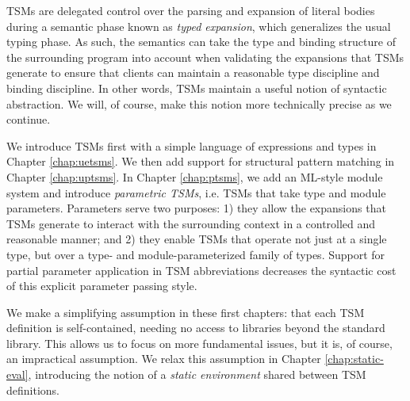 TSMs are delegated control over the parsing and expansion of literal bodies during a semantic phase known as \emph{typed expansion}, which generalizes the usual typing phase. As such, the semantics can take the type and binding structure of the surrounding program into account when validating the expansions that TSMs generate to ensure that clients can maintain a reasonable type discipline and binding discipline. In other words, TSMs maintain a useful notion of syntactic abstraction. %
We will, of course, make this notion more technically precise as we continue.

We introduce TSMs first with a simple language of expressions and types in Chapter \ref{chap:uetsms}. We then add support for  structural pattern matching  in Chapter \ref{chap:uptsms}. In Chapter \ref{chap:ptsms}, we add an ML-style module system and introduce \emph{parametric TSMs}, i.e. TSMs that take type and module parameters. Parameters serve two purposes: 1) they allow the expansions that TSMs generate to interact with the surrounding context in a controlled and reasonable manner; and 2) they enable TSMs that operate not just at a single type, but over a type- and module-parameterized family of types. Support for partial parameter application in TSM abbreviations decreases the syntactic cost of this explicit parameter passing style.

We make a simplifying assumption in these first chapters: that each TSM definition is self-contained, needing no access to libraries beyond the standard library. This allows us to focus on more fundamental issues, but it is, of course, an impractical assumption. We relax this assumption in Chapter \ref{chap:static-eval}, introducing the notion of a \emph{static environment} shared between TSM definitions.


